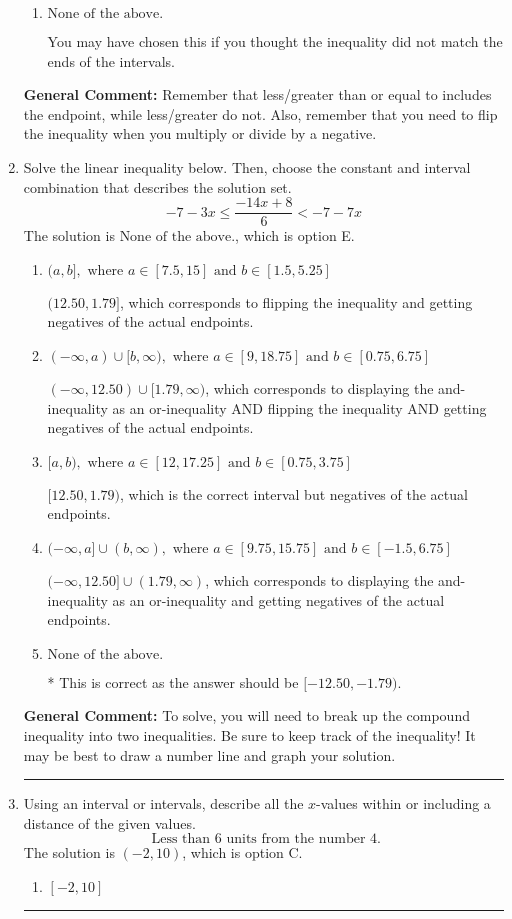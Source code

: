 \documentclass{extbook}[14pt]
\newcommand{\litem}[1]{\item #1

\rule{\textwidth}{0.4pt}}
\begin{document}
\begin{enumerate}
{\begin{enumerate}[label=\Alph*.]
 $(-\infty, 1.588)$, which corresponds to switching the direction of the interval. You likely did this if you did not flip the inequality when dividing by a negative!
\item \( \text{None of the above}. \)

You may have chosen this if you thought the inequality did not match the ends of the intervals.
\end{enumerate}

\textbf{General Comment:} Remember that less/greater than or equal to includes the endpoint, while less/greater do not. Also, remember that you need to flip the inequality when you multiply or divide by a negative.
}
\litem{
Solve the linear inequality below. Then, choose the constant and interval combination that describes the solution set.
\[ -7 - 3 x \leq \frac{-14 x + 8}{6} < -7 - 7 x \]The solution is \( \text{None of the above.} \), which is option E.\begin{enumerate}[label=\Alph*.]
\item \( (a, b], \text{ where } a \in [7.5, 15] \text{ and } b \in [1.5, 5.25] \)

$(12.50, 1.79]$, which corresponds to flipping the inequality and getting negatives of the actual endpoints.
\item \( (-\infty, a) \cup [b, \infty), \text{ where } a \in [9, 18.75] \text{ and } b \in [0.75, 6.75] \)

$(-\infty, 12.50) \cup [1.79, \infty)$, which corresponds to displaying the and-inequality as an or-inequality AND flipping the inequality AND getting negatives of the actual endpoints.
\item \( [a, b), \text{ where } a \in [12, 17.25] \text{ and } b \in [0.75, 3.75] \)

$[12.50, 1.79)$, which is the correct interval but negatives of the actual endpoints.
\item \( (-\infty, a] \cup (b, \infty), \text{ where } a \in [9.75, 15.75] \text{ and } b \in [-1.5, 6.75] \)

$(-\infty, 12.50] \cup (1.79, \infty)$, which corresponds to displaying the and-inequality as an or-inequality and getting negatives of the actual endpoints.
\item \( \text{None of the above.} \)

* This is correct as the answer should be $[-12.50, -1.79)$.
\end{enumerate}

\textbf{General Comment:} To solve, you will need to break up the compound inequality into two inequalities. Be sure to keep track of the inequality! It may be best to draw a number line and graph your solution.
}
\litem{
Using an interval or intervals, describe all the $x$-values within or including a distance of the given values.
\[ \text{ Less than } 6 \text{ units from the number } 4. \]The solution is \( (-2, 10) \), which is option C.\begin{enumerate}[label=\Alph*.]
\item \( [-2, 10] \)


\end{enumerate}}
\end{enumerate}
\end{document}
